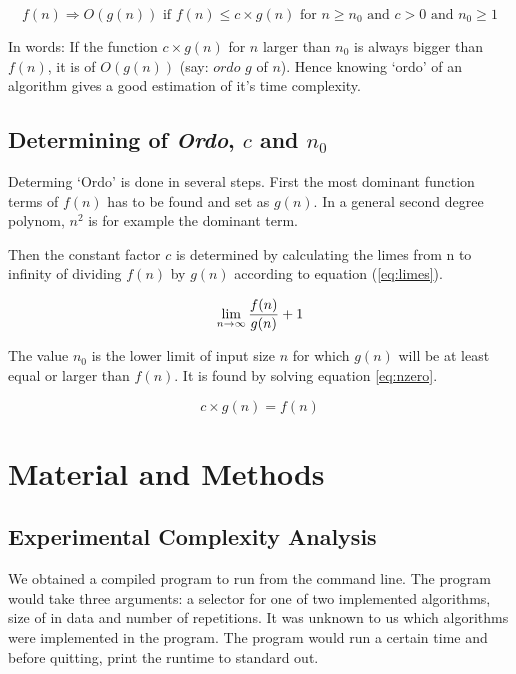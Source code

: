 \documentclass[a4paper,11pt,twoside]{article}
\begin{document}
\begin{equation} \label{eq:ordo}
f(n) \Rightarrow O(g(n)) \textrm{ if } f(n) \leq c \times g(n)
\textrm{ for } n \geq n_{0} \textrm{ and }
c > 0 \textrm{ and } n_{0} \geq 1
\end{equation}

In words: If the function $c \times g(n)$ for $n$ larger than $n_{0}$
is always bigger than $f(n)$, it is of $O(g(n))$ (say: $ordo$  $g$ of
$n$). Hence knowing `ordo' of an algorithm gives a good estimation 
of it's time complexity.

\subsection{Determining of \textit{Ordo}, $c$ and $n_{0}$}
Determing `Ordo' is done in several steps. First the most dominant
function terms of $f(n)$ has to be found and set as $g(n)$. In a
general second degree polynom, $n^2$ is for example the dominant term.

Then the constant factor $c$ is determined by calculating the limes
from n to infinity of dividing $f(n)$ by $g(n)$ according to
equation (\ref{eq:limes}).  

\begin{equation} \label{eq:limes}
\lim_{n \to \infty} {f(n) \over g(n)} + 1
\end{equation}

The value $n_{0}$ is the lower limit of input size $n$ for which
$g(n)$ will be at least equal or larger than $f(n)$. It is found by
solving equation \ref{eq:nzero}. 

\begin{equation} \label{eq:nzero}
c\times g(n) = f(n)
\end{equation}


\section{Material and Methods}

\subsection{Experimental Complexity Analysis}
We obtained a compiled program to run from the command line. The
program would take three arguments: a selector for one of two
implemented algorithms, size of in data and number of repetitions. It
was unknown to us which algorithms were implemented in the
program. The program would run a certain time and before quitting, 
print the runtime to standard out.
\end{document}
